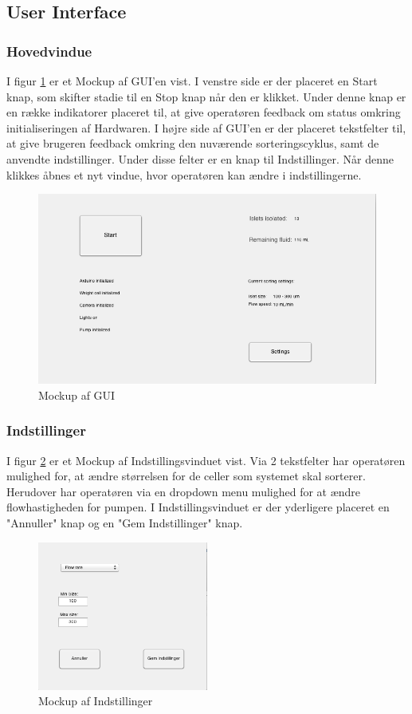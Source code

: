 \subsection{User Interface}
\subsubsection{Hovedvindue}
I figur \ref{fig:gui} er et Mockup af GUI'en vist. I venstre side er der placeret en Start knap, som skifter stadie til en Stop knap når den er klikket. Under denne knap er en række indikatorer placeret til, at give operatøren feedback om status omkring initialiseringen af Hardwaren. 
I højre side af GUI'en er der placeret tekstfelter til, at give brugeren feedback omkring den nuværende sorteringscyklus, samt de anvendte indstillinger. Under disse felter er en knap til Indstillinger. Når denne klikkes åbnes et nyt vindue, hvor operatøren kan ændre i indstillingerne. 
\begin{figure}[H]
	\centering
	\includegraphics[width=1\textwidth]{billeder/GUI.png}
	\caption{Mockup af GUI}
	\label{fig:gui}
\end{figure}

\newpage
\subsubsection{Indstillinger}
I figur \ref{fig:gui_settings} er et Mockup af Indstillingsvinduet vist. Via 2 tekstfelter har operatøren mulighed for, at ændre størrelsen for de celler som systemet skal sorterer. Herudover har operatøren via en dropdown menu mulighed for at ændre flowhastigheden for pumpen. I Indstillingsvinduet er der yderligere placeret en "Annuller" knap og en "Gem Indstillinger" knap.
\begin{figure}[H]
	\centering
	\includegraphics[width=0.5\textwidth]{billeder/GUI_settings.png}
	\caption{Mockup af Indstillinger}
	\label{fig:gui_settings}
\end{figure}


